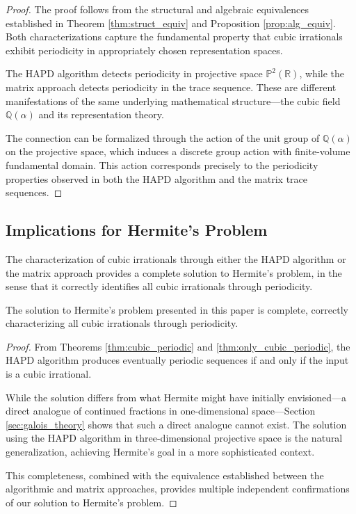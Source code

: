 \begin{proof}
The proof follows from the structural and algebraic equivalences established in Theorem \ref{thm:struct_equiv} and Proposition \ref{prop:alg_equiv}. Both characterizations capture the fundamental property that cubic irrationals exhibit periodicity in appropriately chosen representation spaces.

The HAPD algorithm detects periodicity in projective space $\mathbb{P}^2(\mathbb{R})$, while the matrix approach detects periodicity in the trace sequence. These are different manifestations of the same underlying mathematical structure—the cubic field $\mathbb{Q}(\alpha)$ and its representation theory.

The connection can be formalized through the action of the unit group of $\mathbb{Q}(\alpha)$ on the projective space, which induces a discrete group action with finite-volume fundamental domain. This action corresponds precisely to the periodicity properties observed in both the HAPD algorithm and the matrix trace sequences.
\end{proof}

\subsection{Implications for Hermite's Problem}

The characterization of cubic irrationals through either the HAPD algorithm or the matrix approach provides a complete solution to Hermite's problem, in the sense that it correctly identifies all cubic irrationals through periodicity.

\begin{theorem}\label{thm:complete_solution}
The solution to Hermite's problem presented in this paper is complete, correctly characterizing all cubic irrationals through periodicity.
\end{theorem}

\begin{proof}
From Theorems \ref{thm:cubic_periodic} and \ref{thm:only_cubic_periodic}, the HAPD algorithm produces eventually periodic sequences if and only if the input is a cubic irrational.

While the solution differs from what Hermite might have initially envisioned—a direct analogue of continued fractions in one-dimensional space—Section \ref{sec:galois_theory} shows that such a direct analogue cannot exist. The solution using the HAPD algorithm in three-dimensional projective space is the natural generalization, achieving Hermite's goal in a more sophisticated context.

This completeness, combined with the equivalence established between the algorithmic and matrix approaches, provides multiple independent confirmations of our solution to Hermite's problem.
\end{proof}
